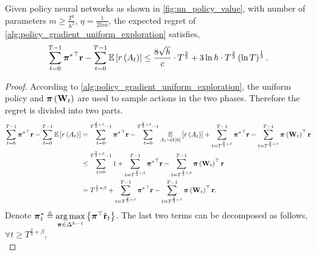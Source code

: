 \begin{thm}
\label{thm:policy_gradient_main_result}
    Given policy neural networks as shown in \cref{fig:nn_policy_value}, with number of parameters $m \ge \frac{T^2}{h^2}$, $\eta = \frac{1}{2 h m}$, the expected regret of \cref{alg:policy_gradient_uniform_exploration} satisfies,
\begin{equation*}
\begin{split}
    \sum\limits_{t=0}^{T-1}{ {{\boldsymbol{\pi}}^*}^\top {\mathbf{r}} } - \sum\limits_{t=0}^{T-1}{ {\mathbb{E}} \left[ r\left(A_t\right) \right] } \le \frac{8 \sqrt{h}}{c} \cdot T^{\frac{2}{3}} + 3 \ln{h} \cdot T^{\frac{2}{3}} \left(\ln{T}\right)^{\frac{1}{3}}.
\end{split}
\end{equation*}
\end{thm}
\begin{proof}
According to \cref{alg:policy_gradient_uniform_exploration}, the uniform policy and ${\boldsymbol{\pi}}\left( {\mathbf{W}}_t \right)$ are used to sample actions in the two phases. Therefore the regret is divided into two parts.
\begin{equation}
\label{eq:total_regret_decomposition}
\begin{split}
    \sum\limits_{t=0}^{T-1}{ {{\boldsymbol{\pi}}^*}^\top {\mathbf{r}} } - \sum\limits_{t=0}^{T-1}{ {\mathbb{E}} \left[ r\left(A_t\right) \right] } &= \sum\limits_{t=0}^{T^{\frac{2}{3} + \beta} - 1}{ {{\boldsymbol{\pi}}^*}^\top {\mathbf{r}}} - \sum\limits_{t=0}^{T^{\frac{2}{3} + \beta} - 1}{ \operatorname*{{\mathbb{E}}}\limits_{A_t \sim {\mathcal{U}}\left[h\right]}{ \left[ r\left(A_t\right) \right] }} + \sum\limits_{t=T^{\frac{2}{3} + \beta}}^{T-1}{ {{\boldsymbol{\pi}}^*}^\top {\mathbf{r}} }  - \sum\limits_{t=T^{\frac{2}{3} + \beta}}^{T-1}{ {\boldsymbol{\pi}}\left( {\mathbf{W}}_t \right)^\top {\mathbf{r}} } \\
    &\le \sum\limits_{t=0}^{T^{\frac{2}{3} + \beta} - 1}{1} + \sum\limits_{t=T^{\frac{2}{3} + \beta}}^{T-1}{ {{\boldsymbol{\pi}}^*}^\top {\mathbf{r}} } - \sum\limits_{t=T^{\frac{2}{3} + \beta}}^{T-1}{ {\boldsymbol{\pi}}\left( {\mathbf{W}}_t \right)^\top {\mathbf{r}} } \\
    &= T^{\frac{2}{3} + \beta} + \sum\limits_{t=T^{\frac{2}{3} + \beta}}^{T-1}{ {{\boldsymbol{\pi}}^*}^\top {\mathbf{r}} } - \sum\limits_{t=T^{\frac{2}{3} + \beta}}^{T-1}{ {\boldsymbol{\pi}}\left( {\mathbf{W}}_t \right)^\top {\mathbf{r}} }.
\end{split}
\end{equation}
Denote ${\boldsymbol{\pi}}_t^* \triangleq \operatorname*{arg\,max}\limits_{{\boldsymbol{\pi}} \in \Delta^{h-1}}{\left\{ {\boldsymbol{\pi}}^\top \hat{{\mathbf{r}}}_t\right\}}$. The last two terms can be decomposed as follows, $\forall t \ge T^{\frac{2}{3} + \beta}$,
\begin{equation}
\label{eq:playing_learning_phase_regret_decomposition}

\end{equation}
\end{proof}

